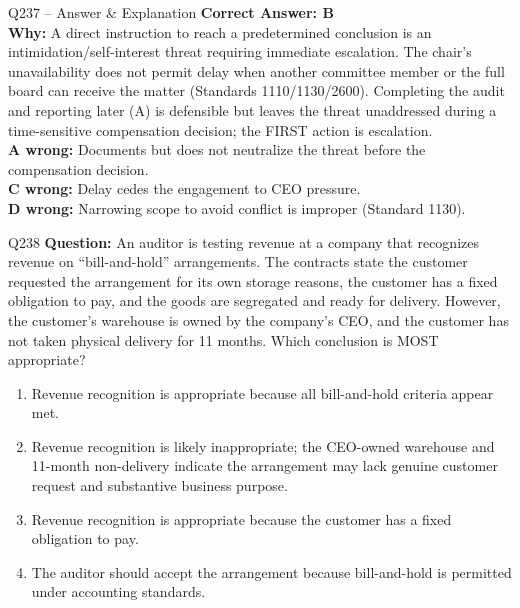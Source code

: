 \documentclass[aspectratio=169,10pt]{beamer}
\begin{document}
	\begin{frame}[t]{Q237 -- Answer \& Explanation}
		\small
		\textbf{Correct Answer: B} \\[4pt]
		\textbf{Why:} A direct instruction to reach a predetermined conclusion is an intimidation/self-interest threat requiring immediate escalation. The chair's unavailability does not permit delay when another committee member or the full board can receive the matter (Standards 1110/1130/2600). Completing the audit and reporting later (A) is defensible but leaves the threat unaddressed during a time-sensitive compensation decision; the FIRST action is escalation. \\[4pt]
		\textbf{A wrong:} Documents but does not neutralize the threat before the compensation decision. \\[2pt]
		\textbf{C wrong:} Delay cedes the engagement to CEO pressure. \\[2pt]
		\textbf{D wrong:} Narrowing scope to avoid conflict is improper (Standard 1130).
	\end{frame}
	
	\begin{frame}[t]{Q238}
		\small
		\textbf{Question:} An auditor is testing revenue at a company that recognizes revenue on ``bill-and-hold'' arrangements. The contracts state the customer requested the arrangement for its own storage reasons, the customer has a fixed obligation to pay, and the goods are segregated and ready for delivery. However, the customer's warehouse is owned by the company's CEO, and the customer has not taken physical delivery for 11 months. Which conclusion is MOST appropriate?
		\begin{enumerate}[label=\Alph*.,itemsep=1pt,topsep=2pt]
			\item Revenue recognition is appropriate because all bill-and-hold criteria appear met.
			\item Revenue recognition is likely inappropriate; the CEO-owned warehouse and 11-month non-delivery indicate the arrangement may lack genuine customer request and substantive business purpose.
			\item Revenue recognition is appropriate because the customer has a fixed obligation to pay.
			\item The auditor should accept the arrangement because bill-and-hold is permitted under accounting standards.
		\end{enumerate}
	\end{frame}
	
\end{document}
